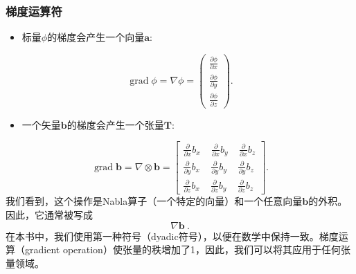 \documentclass[MathematicsNumericsDerivationsAndOpenFOAM.tex]{subfiles}
\begin{document}
\subsubsection{梯度运算符}
%
%
\begin{itemize}
    \item 标量$\phi$的梯度会产生一个向量$\textbf{a}$:
\end{itemize}
%
%
\begin{equation}
 \operatorname{grad}\phi = \nabla \phi
=
  \left(
  \begin{matrix}
    \frac{\partial \phi}{\partial x} \\
    \frac{\partial \phi}{\partial y} \\
    \frac{\partial \phi}{\partial z}
  \end{matrix}
  \right) .
  \label{EQUATION::gradientScalar}
\end{equation}
%
%
\begin{itemize}
    \item 一个矢量$\textbf{b}$的梯度会产生一个张量$\textbf{T}$:
\end{itemize}
%
%
\begin{equation}
 \operatorname{grad}\textbf{b} = \nabla \otimes \textbf{b}
=
  \left[
  \begin{matrix}
   \frac{\partial}{\partial x}b_x ~ ~ ~ ~ ~ \frac{\partial}{\partial x} b_y ~ ~ ~ ~ ~ \frac{\partial}{\partial x} b_z \\
   \frac{\partial}{\partial y}b_x ~ ~ ~ ~ ~ \frac{\partial}{\partial y} b_y ~ ~ ~ ~ ~ \frac{\partial}{\partial y} b_z \\
   \frac{\partial}{\partial z}b_x ~ ~ ~ ~ ~ \frac{\partial}{\partial z} b_y ~ ~ ~ ~ ~ \frac{\partial}{\partial z} b_z
  \end{matrix}
  \right] .
   \label{EQUATION::gradientVector}
\end{equation}
%
%
我们看到，这个操作是Nabla算子（一个特定的向量）和一个任意向量$\textbf{b}$的外积。因此，它通常被写成
%
%
\begin{equation}
  \nabla \textbf{b} ~.
\end{equation}
%
%
    在本书中，我们使用第一种符号（dyadic符号），以便在数学中保持一致。梯度运算（gradient operation）使张量的秩增加了1，因此，我们可以将其应用于任何张量领域。
%
%
%
%
\end{document}
